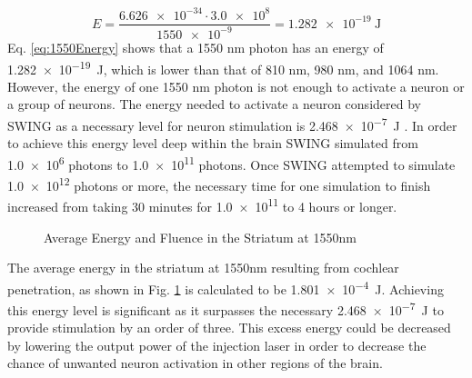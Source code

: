 \documentclass[journal,twoside,web]{ieeecolor}
\begin{document}
\begin{equation}
    \label{eq:1550Energy}
    E = \frac{\num{6.626e-34}\cdot\num{3.0e8}}{\num{1550e-9}} = \SI{1.282e-19}{\joule}
\end{equation}
Eq. \eqref{eq:1550Energy} shows that a 1550 nm photon has an energy of \SI{1.282e-19}{\joule}, which is lower than that of 810 nm, 980 nm, and 1064 nm. However, 
the energy of one 1550 nm photon is not enough to activate a neuron or a group of neurons. The energy needed to activate a neuron considered by SWING as a 
necessary level for neuron stimulation is \SI{2.468e-7}{\joule} \cite{b8}. In order to achieve this energy level deep within the brain SWING simulated from 
\num{1.0e6} photons to \num{1.0e11} photons. Once SWING attempted to simulate \num{1.0e12} photons or more, the necessary time for one simulation to finish 
increased from taking 30 minutes for \num{1.0e11} to 4 hours or longer.

\begin{figure}[hbt!]
    \caption{\label{fig:Avg1550} Average Energy and Fluence in the Striatum at 1550nm}
\end{figure}

The average energy in the striatum at 1550nm resulting from cochlear penetration, as shown in Fig. \ref{fig:Avg1550} is calculated to 
be \SI{1.801e-4}{\joule}. Achieving this energy level is significant as it surpasses the necessary \SI{2.468e-7}{\joule} to provide stimulation by an order of three. 
This excess energy could be decreased by lowering the output power of the injection laser in order to decrease the chance of unwanted neuron 
activation in other regions of the brain.
\end{document}
